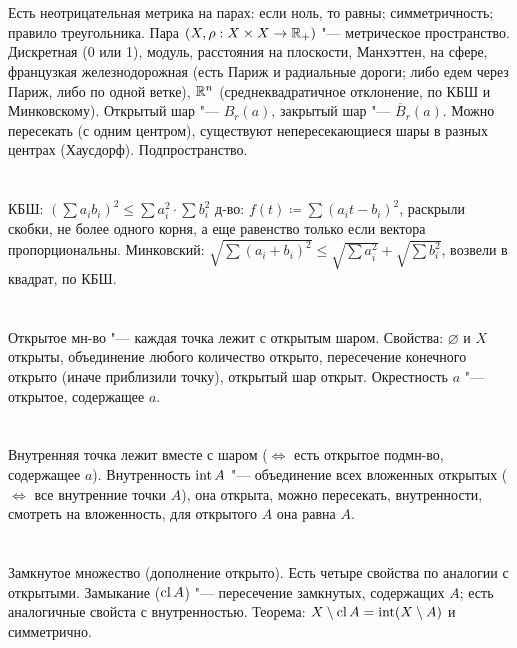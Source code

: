 \section{} %
Есть неотрицательная метрика на парах: если ноль, то равны; симметричность; правило треугольника.
Пара $(X, \rho: X\times X \to \mathbb{R}_+)$ "--- метрическое пространство. Дискретная (0 или 1), модуль,
расстояния на плоскости, Манхэттен, на сфере, французкая железнодорожная (есть Париж и радиальные дороги;
либо едем через Париж, либо по одной ветке), $\mathbb{R}^n$ (среднеквадратичное отклонение, по КБШ и Минковскому).
Открытый шар "--- $B_r(a)$, закрытый шар "--- $\overline B_r(a)$. Можно пересекать (с одним центром),
существуют непересекающиеся шары в разных центрах (Хаусдорф). Подпространство.

\section{} %
КБШ: $\left(\sum a_ib_i\right)^2 \le \sum a_i^2 \cdot \sum b_i^2$
д-во: $f(t)\coloneqq \sum(a_it-b_i)^2$, раскрыли скобки, не более одного корня, а еще равенство только если вектора пропорциональны.
Минковский: $\sqrt{\sum(a_i+b_i)^2}\le\sqrt{\sum a_i^2}+\sqrt{\sum b_i^2}$, возвели в квадрат, по КБШ.

\section{} %
Открытое мн-во "--- каждая точка лежит с открытым шаром. Свойства: $\varnothing$ и $X$ открыты, объединение
любого количество открыто, пересечение конечного открыто (иначе приблизили точку), открытый шар открыт.
Окрестность $a$ "--- открытое, содержащее $a$.

\section{} %
Внутренняя точка лежит вместе с шаром ($\iff$ есть открытое подмн-во, содержащее $a$).
Внутренность $\operatorname{int} A$ "--- объединение всех вложенных открытых ($\iff$ все внутренние точки $A$),
она открыта, можно пересекать, внутренности, смотреть на вложенность, для открытого $A$ она равна $A$.

\section{} %
Замкнутое множество (дополнение открыто). Есть четыре свойства по аналогии с открытыми.
Замыкание ($\operatorname{cl} A$) "--- пересечение замкнутых, содержащих $A$; есть аналогичные свойста с внутренностью.
Теорема: $X\setminus \operatorname{cl} A=\operatorname{int}(X\setminus A)$ и симметрично.


